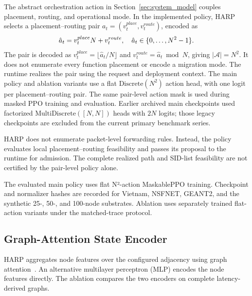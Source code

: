 \documentclass[final,5p]{elsarticle}
\newcommand{\rev}[1]{\textcolor{revisiongreen}{#1}}
\let\newrev\rev
\begin{document}
The abstract orchestration action in Section~\ref{sec:system_model} couples placement, routing, and operational mode. \rev{In the implemented policy, HARP selects a placement--routing pair \(a_t=(v_t^{place},v_t^{route})\), encoded as}
\begin{equation}
\rev{\hat a_t=v_t^{place}N+v_t^{route},\quad \hat a_t\in\{0,\ldots,N^2-1\}.}
\label{eq:harp_action_encoding}
\end{equation}
\rev{The pair is decoded as \(v_t^{place}=\lfloor\hat a_t/N\rfloor\) and \(v_t^{route}=\hat a_t\bmod N\), giving \(|\mathcal A|=N^2\). It does not enumerate every function placement or encode a migration mode. The runtime realizes the pair using the request and deployment context. The main policy and ablation variants use a flat \(\mathrm{Discrete}(N^2)\) action head, with one logit per placement--routing pair. The same pair-level action mask is used during masked PPO training and evaluation. Earlier archived main checkpoints used factorized \(\mathrm{MultiDiscrete}([N,N])\) heads with \(2N\) logits; those legacy checkpoints are excluded from the current primary benchmark series.}

HARP does not enumerate packet-level forwarding rules. Instead, \rev{the policy evaluates local placement--routing feasibility and passes its proposal to the runtime for admission. The complete realized path and SID-list feasibility are not certified by the pair-level policy alone.}

\newrev{The evaluated main policy uses flat N²-action MaskablePPO training. Checkpoint and normalizer hashes are recorded for Vietnam, NSFNET, GEANT2, and the synthetic 25-, 50-, and 100-node substrates. Ablation uses separately trained flat-action variants under the matched-trace protocol.}

\subsection{Graph-Attention State Encoder}
\label{subsec:harp_gat}

\newrev{HARP aggregates node features over the configured adjacency using graph attention~\cite{velickovic2018graph}. An alternative multilayer perceptron (MLP) encodes the node features directly. The ablation compares the two encoders on complete latency-derived graphs.}
\end{document}
